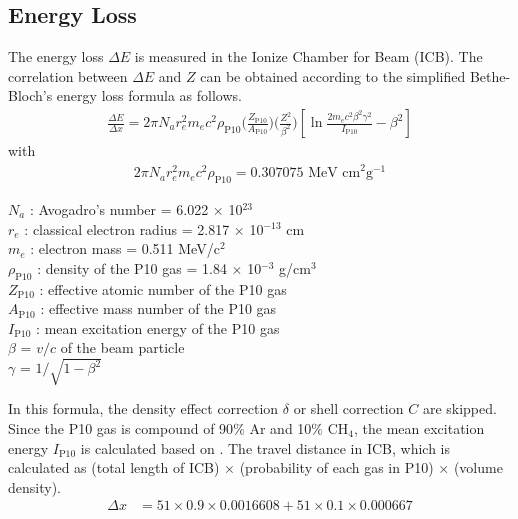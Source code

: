 \subsection{Energy Loss}
The energy loss $\Delta E$ is measured in the Ionize Chamber for Beam (ICB). The correlation between $\Delta E$ and $Z$ can be obtained according to the simplified Bethe-Bloch's energy loss formula as follows.
    \begin{align}
        \frac{\Delta E}{\Delta x} = 2\pi N_{a} r_{e}^{2} m_{e} c^{2} \rho_{\text{P10}} 
        \bigg( \frac{Z_{\text{P10}}}{A_{\text{P10}}} \bigg) \bigg( \frac{Z^{2}}{\beta^{2}} \bigg) 
        \left[ \ln \frac{2m_{e}c^{2}\beta^{2}\gamma^{2}}{I_{\text{P10}}} - \beta^{2}  \right]
    \end{align}
with
    \begin{align}
        2 \pi N_{a} r_{e}^{2} m_{e} c^{2} \rho_{\text{P10}} = 0.307075 \text{ MeV cm}^{2} \text{g}^{-1} 
    \end{align}
    \begin{adjustwidth}{1cm}{}
        $N_{a}$ : Avogadro's number = 6.022 $\times$ 10$^{23}$\\
        $r_{e}$ : classical electron radius = 2.817 $\times$ 10$^{-13}$ cm\\ 
        $m_{e}$ : electron mass = 0.511 MeV/c$^{2}$\\
        $\rho_{\text{P10}}$ : density of the P10 gas = 1.84 $\times$ 10$^{-3}$ g/cm$^{3}$\\
        $Z_{\text{P10}}$ : effective atomic number of the P10 gas\\
        $A_{\text{P10}}$ : effective mass number of the P10 gas\\
        $I_{\text{P10}}$ : mean excitation energy of the P10 gas\\ 
        $\beta$ = $v / c$ of the beam particle\\
        $\gamma$ = $1 / \sqrt{1-\beta^{2}}$
    \end{adjustwidth}
\vspace{3mm}
In this formula, the density effect correction $\delta$ or shell correction $C$ are skipped. Since the P10 gas is compound of 90$\%$ Ar and 10$\%$ CH$_{4}$, the mean excitation energy $I_{\text{P10}}$ is calculated based on \cite{LEO}. The travel distance in ICB, which is calculated as (total length of ICB) $\times$ (probability of each gas in P10) $\times$ (volume density).
\begin{align}
    \Delta x &= 51\times0.9\times0.0016608 + 51\times0.1\times0.000667 
\end{align}


